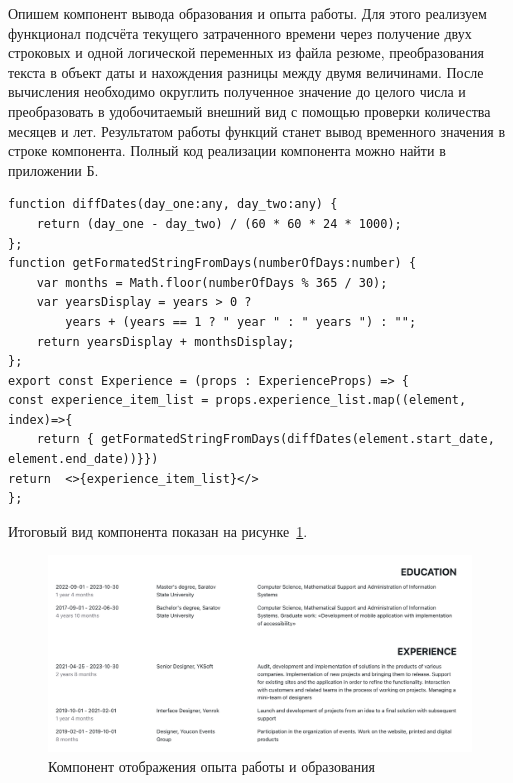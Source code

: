 \documentclass[master, och, diploma]{SCWorks}
\begin{document}
Опишем компонент вывода образования и опыта работы. Для этого реализуем функционал подсчёта текущего затраченного времени через получение двух строковых и одной логической переменных из файла резюме, преобразования текста в объект даты и нахождения разницы между двумя величинами. После вычисления необходимо округлить полученное значение до целого числа и преобразовать в удобочитаемый внешний вид с помощью проверки количества месяцев и лет. Результатом работы функций станет вывод временного значения в строке компонента. Полный код реализации компонента можно найти в приложении Б.
\begin{verbatim}
function diffDates(day_one:any, day_two:any) {
    return (day_one - day_two) / (60 * 60 * 24 * 1000);
};
function getFormatedStringFromDays(numberOfDays:number) {
    var months = Math.floor(numberOfDays % 365 / 30);
    var yearsDisplay = years > 0 ? 
        years + (years == 1 ? " year " : " years ") : "";
    return yearsDisplay + monthsDisplay; 
};
export const Experience = (props : ExperienceProps) => {
const experience_item_list = props.experience_list.map((element, index)=>{
    return { getFormatedStringFromDays(diffDates(element.start_date, element.end_date))}})
return  <>{experience_item_list}</>
};
\end{verbatim}

Итоговый вид компонента показан на рисунке~\ref{fig:26}.  
\begin{figure}[!ht]
    \centering
    \includegraphics[width=12cm]{images/image-resume-2.png}
    \caption{\label{fig:26}%
        Компонент отображения опыта работы и образования}
\end{figure}
\end{document}
